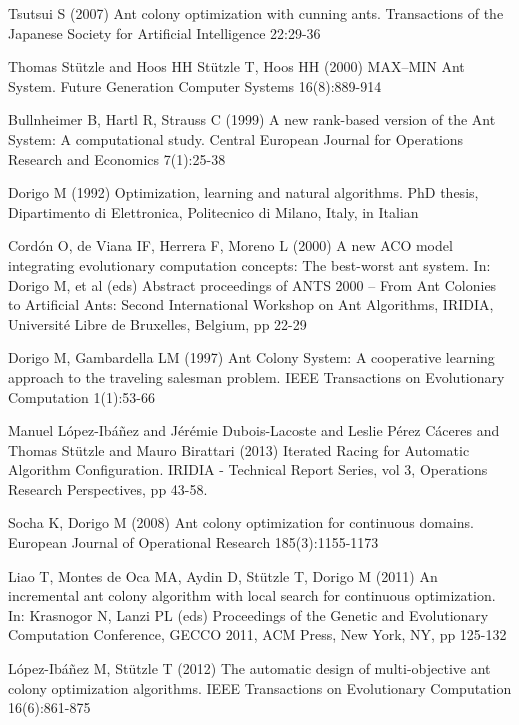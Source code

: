 \documentclass[12pt]{article}
\begin{document}
\begin{thebibliography}{1}
 Tsutsui S (2007) Ant colony optimization with cunning ants. Transactions of the Japanese Society for Artificial Intelligence 22:29-36

 Thomas St{\"u}tzle and Hoos HH Stützle T, Hoos HH (2000) MAX–MIN Ant System. Future Generation Computer Systems 16(8):889-914

 Bullnheimer B, Hartl R, Strauss C (1999) A new rank-based version of the Ant System: A computational study. Central European Journal for Operations Research and Economics 7(1):25-38

 Dorigo M (1992) Optimization, learning and natural algorithms. PhD thesis, Dipartimento di Elettronica, Politecnico di Milano, Italy, in Italian

 Cord{\'o}n O, de Viana IF, Herrera F, Moreno L (2000) A new ACO model integrating evolutionary computation concepts: The best-worst ant system. In: Dorigo M, et al (eds) Abstract proceedings of ANTS 2000 – From Ant Colonies to Artificial Ants: Second International Workshop on Ant Algorithms, IRIDIA, Universit{\'e} Libre de Bruxelles, Belgium, pp 22-29

 Dorigo M, Gambardella LM (1997) Ant Colony System: A cooperative learning approach to the traveling salesman problem. IEEE Transactions on Evolutionary Computation 1(1):53-66

 Manuel L{\'o}pez-Ib{\'a}{\~n}ez and J{\'e}r{\'e}mie Dubois-Lacoste and Leslie {P{\'e}rez C{\'a}ceres} and Thomas St{\"u}tzle  and  Mauro Birattari (2013) Iterated Racing for Automatic Algorithm Configuration. IRIDIA - Technical Report Series, vol 3, Operations Research Perspectives, pp 43-58.

 Socha K, Dorigo M (2008) Ant colony optimization for continuous domains. European Journal of Operational Research 185(3):1155-1173
  
 Liao T, Montes de Oca MA, Aydin D, St{\"u}tzle T, Dorigo M (2011) An incremental ant colony algorithm with local search for continuous optimization. In: Krasnogor N, Lanzi PL (eds) Proceedings of the Genetic and Evolutionary Computation Conference, GECCO 2011, ACM Press, New York, NY, pp 125-132
  
 L{\'o}pez-Ib{\'a}{\~n}ez M, St{\"u}tzle T (2012) The automatic design of multi-objective ant colony optimization algorithms. IEEE Transactions on Evolutionary Computation 16(6):861-875


\end{thebibliography}
\end{document}
